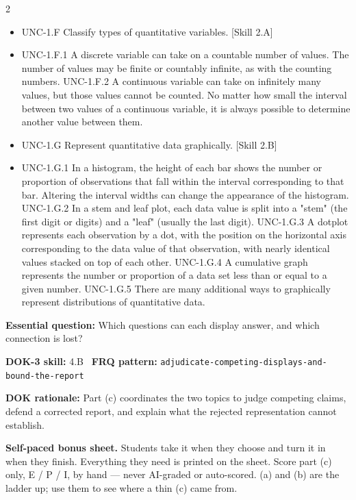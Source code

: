 \documentclass[11pt]{article}
\begin{document}
\begin{multicols}{2}
{\begin{itemize}[leftmargin=*,itemsep=0pt,topsep=0pt]
\item UNC-1.F Classify types of quantitative variables. [Skill 2.A]
\item UNC-1.F.1 A discrete variable can take on a countable number of values. The number of values may be finite or countably infinite, as with the counting numbers.  UNC-1.F.2 A continuous variable can take on infinitely many values, but those values cannot be counted. No matter how small the interval between two values of a continuous variable, it is always possible to determine another value between them.
\item UNC-1.G Represent quantitative data graphically. [Skill 2.B]
\item UNC-1.G.1 In a histogram, the height of each bar shows the number or proportion of observations that fall within the interval corresponding to that bar. Altering the interval widths can change the appearance of the histogram.  UNC-1.G.2 In a stem and leaf plot, each data value is split into a "stem" (the first digit or digits) and a "leaf" (usually the last digit).  UNC-1.G.3 A dotplot represents each observation by a dot, with the position on the horizontal axis corresponding to the data value of that observation, with nearly identical values stacked on top of each other.  UNC-1.G.4 A cumulative graph represents the number or proportion of a data set less than or equal to a given number.  UNC-1.G.5 There are many additional ways to graphically represent distributions of quantitative data.
\end{itemize}}
\end{multicols}
\clearpage
\small
\textbf{Essential question:} Which questions can each display answer, and which connection is lost?\par
\textbf{DOK-3 skill:} 4.B \textperiodcentered\ \textbf{FRQ pattern:} {\small\texttt{adjudicate-\allowbreak{}competing-\allowbreak{}displays-\allowbreak{}and-\allowbreak{}bound-\allowbreak{}the-\allowbreak{}report}}\par
\textbf{DOK rationale:} Part (c) coordinates the two topics to judge competing claims, defend a corrected report, and explain what the rejected representation cannot establish.\par

\textbf{Self-paced bonus sheet.} Students take it when they choose and turn it in when they finish. Everything they need is printed on the sheet. Score part (c) only, E / P / I, by hand --- never AI-graded or auto-scored. (a) and (b) are the ladder up; use them to see where a thin (c) came from.\par
\end{document}
